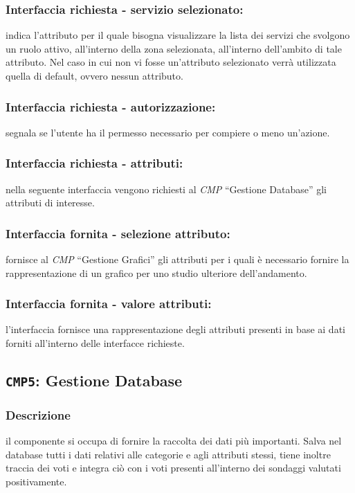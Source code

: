         \subsubsection{Interfaccia richiesta - servizio selezionato:}
            indica l'attributo per il quale bisogna visualizzare la lista dei servizi che svolgono un ruolo attivo, all'interno della zona selezionata, all'interno dell'ambito di tale attributo. Nel caso in cui non vi fosse un'attributo selezionato verrà utilizzata quella di default, ovvero nessun attributo.
        \subsubsection{Interfaccia richiesta - autorizzazione:}
            segnala se l'utente ha il permesso necessario per compiere o meno un'azione.
        \subsubsection{Interfaccia richiesta - attributi:}
            nella seguente interfaccia vengono richiesti al \textit{CMP} ``Gestione Database'' gli attributi di  interesse.
        \subsubsection{Interfaccia fornita - selezione attributo:}
            fornisce al \textit{CMP} ``Gestione Grafici'' gli attributi per i quali è necessario fornire la rappresentazione di un grafico per uno studio ulteriore dell'andamento.
        \subsubsection{Interfaccia fornita - valore attributi:}
            l'interfaccia fornisce una rappresentazione degli attributi presenti in base ai dati forniti all'interno delle interfacce richieste.

    \subsection{\texttt{CMP5}: Gestione Database}
        \subsubsection{Descrizione} 
            il componente si occupa di fornire la raccolta dei dati più importanti. Salva nel database tutti i dati relativi alle categorie e agli attributi stessi, tiene inoltre traccia dei voti e integra ciò con i voti presenti all'interno dei sondaggi valutati positivamente.
